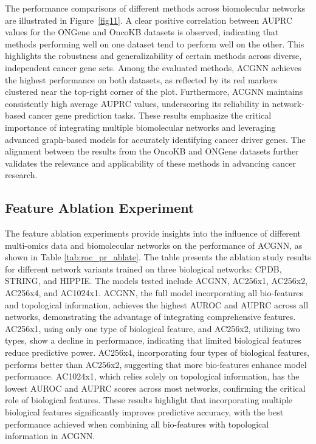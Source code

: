 The performance comparisons of different methods across biomolecular networks are illustrated in Figure~\ref{fig11}. A clear positive correlation between AUPRC values for the ONGene and OncoKB datasets is observed, indicating that methods performing well on one dataset tend to perform well on the other. This highlights the robustness and generalizability of certain methods across diverse, independent cancer gene sets.
Among the evaluated methods, ACGNN  achieves the highest performance on both datasets, as reflected by its red markers clustered near the top-right corner of the plot. Furthermore, ACGNN  maintains consistently high average AUPRC values, underscoring its reliability in network-based cancer gene prediction tasks.
These results emphasize the critical importance of integrating multiple biomolecular networks and leveraging advanced graph-based models for accurately identifying cancer driver genes. The alignment between the results from the OncoKB and ONGene datasets further validates the relevance and applicability of these methods in advancing cancer research.
 


\subsection{Feature Ablation Experiment}

The feature ablation experiments provide insights into the influence of different multi-omics data and biomolecular networks on the performance of ACGNN, as shown in Table \ref{tab:roc_pr_ablate}.
The table presents the ablation study results for different network variants trained on three biological networks: CPDB, STRING, and HIPPIE. The models tested include ACGNN, AC256x1, AC256x2, AC256x4, and AC1024x1. 
 ACGNN, the full model incorporating all bio-features and topological information, achieves the highest AUROC and AUPRC across all networks, demonstrating the advantage of integrating comprehensive features. AC256x1, using only one type of biological feature, and AC256x2, utilizing two types, show a decline in performance, indicating that limited biological features reduce predictive power. AC256x4, incorporating four types of biological features, performs better than AC256x2, suggesting that more bio-features enhance model performance. AC1024x1, which relies solely on topological information, has the lowest AUROC and AUPRC scores across most networks, confirming the critical role of biological features. These results highlight that incorporating multiple biological features significantly improves predictive accuracy, with the best performance achieved when combining all bio-features with topological information in ACGNN.

